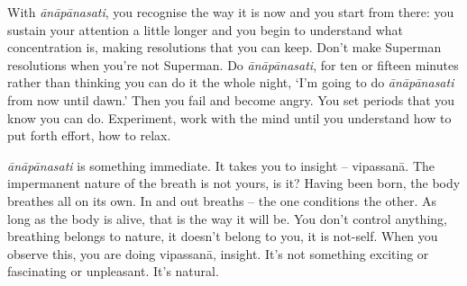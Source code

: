 With \textit{\=an\=ap\=anasati}, you recognise the way it is now and you start from there: you sustain your attention a little longer and you begin to understand what concentration is, making resolutions that you can keep. Don't make Superman resolutions when you're not Superman. Do \textit{\=an\=ap\=anasati}, for ten or fifteen minutes rather than thinking you can do it the whole night, `I'm going to do \textit{\=an\=ap\=anasati} from now until dawn.' Then you fail and become angry. You set periods that you know you can do. Experiment, work with the mind until you understand how to put forth effort, how to relax.

\textit{\=an\=ap\=anasati} is something immediate. It takes you to insight -- vipassanā. The impermanent nature of the breath is not yours, is it? Having been born, the body breathes all on its own. In and out breaths -- the one conditions the other. As long as the body is alive, that is the way it will be. You don't control anything, breathing belongs to nature, it doesn't belong to you, it is not-self. When you observe this, you are doing vipassanā, insight. It's not something exciting or fascinating or unpleasant. It's natural.

